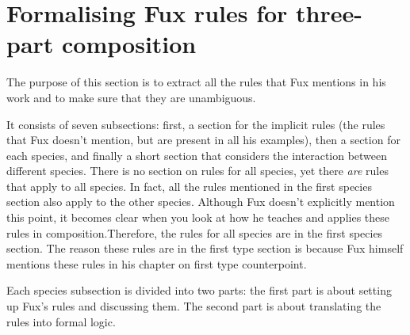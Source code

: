 \chapter{Formalising Fux rules for three-part composition}\label{chapter:species}
The purpose of this section is to extract all the rules that Fux mentions in his work and to make sure that they are unambiguous.

It consists of seven subsections: first, a section for the implicit rules (the rules that Fux doesn't mention, but are present in all his examples), then a section for each species, and finally a short section that considers the interaction between different species. There is no section on rules for all species, yet there \textit{are} rules that apply to all species. In fact, all the rules mentioned in the first species section also apply to the other species. Although Fux doesn't explicitly mention this point, it becomes clear when you look at how he teaches and applies these rules in composition.Therefore, the rules for all species are in the first species section. The reason these rules are in the first type section is because Fux himself mentions these rules in his chapter on first type counterpoint.

Each species subsection is divided into two parts: the first part is about setting up Fux's rules and discussing them. The second part is about translating the rules into formal logic.

